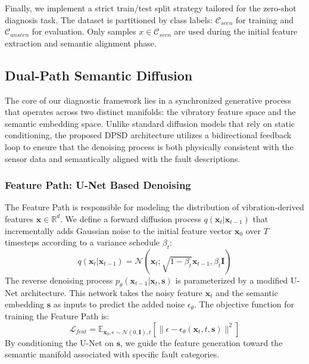 \documentclass[journal,12pt,onecolumn]{IEEEtran}
\begin{document}
Finally, we implement a strict train/test split strategy tailored for the zero-shot diagnosis task. The dataset is partitioned by class labels: $\mathcal{C}_{seen}$ for training and $\mathcal{C}_{unseen}$ for evaluation. Only samples $x \in \mathcal{C}_{seen}$ are used during the initial feature extraction and semantic alignment phase.

\subsection{Dual-Path Semantic Diffusion}
The core of our diagnostic framework lies in a synchronized generative process that operates across two distinct manifolds: the vibratory feature space and the semantic embedding space. Unlike standard diffusion models that rely on static conditioning, the proposed DPSD architecture utilizes a bidirectional feedback loop to ensure that the denoising process is both physically consistent with the sensor data and semantically aligned with the fault descriptions.

\subsubsection{Feature Path: U-Net Based Denoising}
The Feature Path is responsible for modeling the distribution of vibration-derived features $\mathbf{x} \in \mathbb{R}^d$. We define a forward diffusion process $q(\mathbf{x}_t | \mathbf{x}_{t-1})$ that incrementally adds Gaussian noise to the initial feature vector $\mathbf{x}_0$ over $T$ timesteps according to a variance schedule $\beta_t$:
\begin{equation}
q(\mathbf{x}_t | \mathbf{x}_{t-1}) = \mathcal{N}(\mathbf{x}_t; \sqrt{1 - \beta_t} \mathbf{x}_{t-1}, \beta_t \mathbf{I})
\end{equation}
The reverse denoising process $p_\theta(\mathbf{x}_{t-1} | \mathbf{x}_t, \mathbf{s})$ is parameterized by a modified U-Net architecture. This network takes the noisy feature $\mathbf{x}_t$ and the semantic embedding $\mathbf{s}$ as inputs to predict the added noise $\epsilon_\theta$. The objective function for training the Feature Path is:
\begin{equation}
\mathcal{L}_{feat} = \mathbb{E}_{\mathbf{x}_0, \epsilon \sim \mathcal{N}(0,\mathbf{I}), t} \left[ \| \epsilon - \epsilon_\theta(\mathbf{x}_t, t, \mathbf{s}) \|^2 \right]
\end{equation}
By conditioning the U-Net on $\mathbf{s}$, we guide the feature generation toward the semantic manifold associated with specific fault categories.
\end{document}
